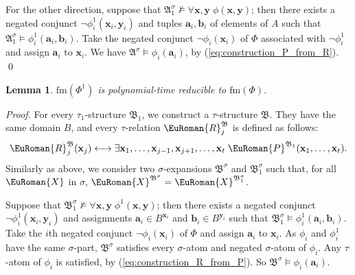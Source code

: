 \documentclass[10pt,a4paper]{amsart}
\theoremstyle{plain}
\newtheorem{lem}[thm]{Lemma}
\theoremstyle{definition}
\numberwithin{equation}{section}
\renewcommand{\proof}[1][Proof]{\par\noindent\textit{#1.}\enspace\ignorespaces}
\newcommand{\eurm}[1]{\EuRoman{#1}} %
\newcommand{\structure}[1]{\mathfrak{#1}} %
\newcommand{\tuple}[1]{\mathbf{#1}} %
\newcommand{\rel}[1]{\eurm{#1}} %
\newcommand{\Sat}[0]{\ensuremath{\mathrm{fm}}}
\begin{document}
For the other direction, suppose that $\structure{A}_1^\sigma\not\models\forall\tuple{x},\tuple{y}\;\phi(\tuple{x},\tuple{y})$; then there exists a negated conjunct $\neg\phi_i^1(\tuple{x}_i,\tuple{y}_i)$ and tuples $\tuple{a}_i,\tuple{b}_i$ of elements of $A$ such that $\structure{A}_1^\sigma\models\phi_i^1(\tuple{a}_i,\tuple{b}_i)$.
Take the negated conjunct $\neg\phi_i(\tuple{x}_i)$ of $\Phi$ associated with $\neg\phi_i^1$ and assign $\tuple{a}_i$ to $\tuple{x}_i$.
We have $\structure{A}^\sigma\models\phi_i (\tuple{a}_i)$, by (\ref{eq:construction_P_from_R}).
\qed




\begin{lem}\label{lemma:one_symbol2} 
$\Sat(\Phi^1)$ is polynomial-time reducible to $\Sat(\Phi)$.
\end{lem}
\proof
For every $\tau_1$-structure $\structure{B}_1$, we construct a $\tau$-structure $\structure{B}$.
They have the same domain $B$, and every $\tau$-relation $\rel{R}_j^\structure{B}$ is defined as follows:
\begin{equation}\label{eq:construction_R_from_P}
\rel{R}_j^\structure{B}(\tuple{x}_j)\longleftrightarrow\exists\tuple{x}_1,\ldots,\tuple{x}_{j-1},\tuple{x}_{j+1},\ldots,\tuple{x}_t\;\rel{P}^{\structure{B}_1}(\tuple{x}_1,\ldots,\tuple{x}_t).
\end{equation}
Similarly as above, we consider two $\sigma$-expansions $\structure{B}^\sigma$ and $\structure{B}_1^\sigma$ such that, for all $\rel{X}$ in $\sigma$, $\rel{X}^{\structure{B}^\sigma}=\rel{X}^{\structure{B}_1^\sigma}$.

Suppose that $\structure{B}_1^\sigma\not\models\forall\tuple{x},\tuple{y}\;\phi^1(\tuple{x},\tuple{y})$; then there exists a negated conjunct $\neg\phi_i^1(\tuple{x}_i,\tuple{y}_i)$ and assignments $\tuple{a}_i\in B^{\tuple{x}_i}$ and $\tuple{b}_i\in B^{\tuple{y}_i}$ such that $\structure{B}_1^\sigma\models\phi_i^1(\tuple{a}_i,\tuple{b}_i)$.
Take the $i$th negated conjunct $\neg\phi_i(\tuple{x}_i)$ of $\Phi$ and assign $\tuple{a}_i$ to $\tuple{x}_i$.
As $\phi_i$ and $\phi_i^1$ have the same $\sigma$-part, $\structure{B}^\sigma$ satisfies every $\sigma$-atom and negated $\sigma$-atom of $\phi_i$.
Any $\tau$-atom of $\phi_i$ is satisfied, by (\ref{eq:construction_R_from_P}).
So $\structure{B}^\sigma\models\phi_i(\tuple{a}_i)$.
\end{document}

